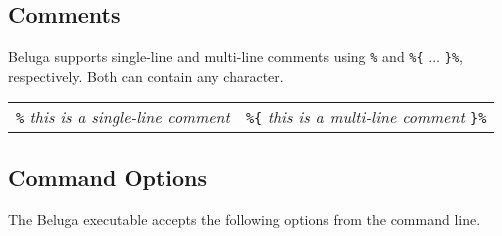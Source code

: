 \documentclass[11pt]{article}
\begin{document}
\subsection{Comments}
Beluga supports single-line and multi-line comments using \texttt{\%} and \texttt{\%\{} $\ldots$ \texttt{\}\%}, respectively. Both can contain any character.
\begin{center}
\begin{tabular}{ | l | r }
  \texttt{\%} \textit{this is a single-line comment} &  \texttt{\%\{} \textit{this is a multi-line comment}  \texttt{\}\%} \\
\end{tabular}
\end{center}


\subsection{Command Options}
The Beluga executable accepts the following options from the command line.\\
\end{document}
